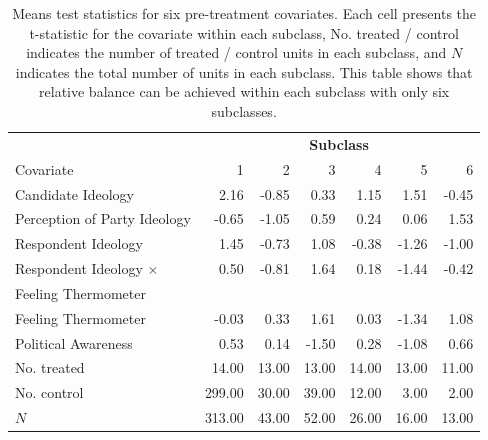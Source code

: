 \documentclass[11pt,titlepage]{article}
\newcommand{\MC}{\multicolumn}
\begin{document}
\begin{table}[t]
  \begin{center}
    \begin{tabular}{lrrrrrr}
      \hline
      & \MC{6}{c}{\bf Subclass} \\
      Covariate &  1 &  2 &  3 &  4 &  5 &  6 \\
      \hline
      Candidate Ideology & 2.16 & -0.85 & 0.33 & 1.15 & 1.51 & -0.45 \\
      Perception of Party Ideology & -0.65 & -1.05 & 0.59 & 0.24 & 0.06 & 1.53 \\
      Respondent Ideology & 1.45 & -0.73 & 1.08 & -0.38 & -1.26 & -1.00 \\
      Respondent Ideology $\times$ & 0.50 & -0.81 & 1.64 & 0.18 &
      -1.44 & -0.42 \\
      \hspace{0.1in} Feeling Thermometer \\
      Feeling Thermometer & -0.03 & 0.33 & 1.61 & 0.03 & -1.34 & 1.08 \\
      Political Awareness & 0.53 & 0.14 & -1.50 & 0.28 & -1.08 & 0.66
      \\ \hline
      No. treated & 14.00 & 13.00 & 13.00 & 14.00 & 13.00 & 11.00 \\
      No. control & 299.00 & 30.00 & 39.00 & 12.00 & 3.00 & 2.00 \\
      $N$ & 313.00 & 43.00 & 52.00 & 26.00 & 16.00 & 13.00 \\
      \hline
    \end{tabular}
    \caption{Means test statistics for six pre-treatment covariates.
      Each cell presents the t-statistic for the covariate within each
      subclass, No. treated / control indicates the number of
      treated / control units in each subclass, and $N$ indicates the
      total number of units in each subclass.  This table shows that
      relative balance can be achieved within each subclass with only
      six subclasses.}
    \label{tb:kochxsub}
  \end{center}
\end{table}
\end{document}
